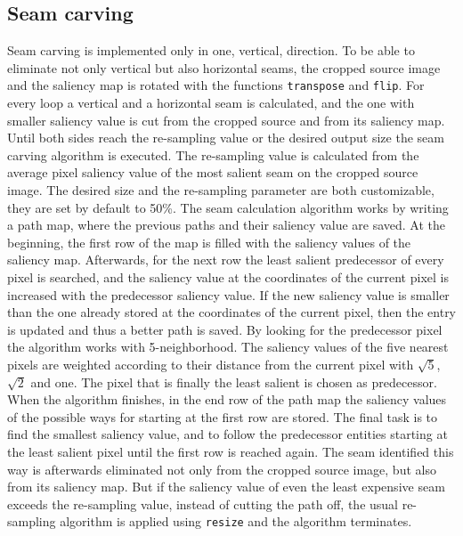 \documentclass[draft,final]{vutinfth} %
\begin{document}
	\subsection{Seam carving}
	Seam carving is implemented only in one, vertical, direction. 
	To be able to eliminate not only vertical but also horizontal seams, the cropped source image and the saliency map is rotated with the functions \texttt{transpose} and \texttt{flip}.
	For every loop a vertical and a horizontal seam is calculated, and the one with smaller saliency value is cut from the cropped source and from its saliency map.
	Until both sides reach the re-sampling value or the desired output size the seam carving algorithm is executed.
	The re-sampling value is calculated from the average pixel saliency value of the most salient seam on the cropped source image.
	The desired size and the re-sampling parameter are both customizable, they are set by default to 50\%. 
	The seam calculation algorithm works by writing a path map, where the previous paths and their saliency value are saved.
	At the beginning, the first row of the map is filled with the saliency values of the saliency map.
	Afterwards, for the next row the least salient predecessor of every pixel is searched, and the saliency value at the coordinates of the current pixel is increased with the predecessor saliency value.
	If the new saliency value is smaller than the one already stored at the coordinates of the current pixel, then the entry is updated and thus a better path is saved.
	By looking for the predecessor pixel the algorithm works with 5-neighborhood. 
	The saliency values of the five nearest pixels are weighted according to their distance from the current pixel with $\sqrt{5}$, $\sqrt{2}$ and one.
	The pixel that is finally the least salient is chosen as predecessor.
	When the algorithm finishes, in the end row of the path map the saliency values of the possible ways for starting at the first row are stored.
	The final task is to find the smallest saliency value, and to follow the predecessor entities starting at the least salient pixel until the first row is reached again.
	The seam identified this way is afterwards eliminated not only from the cropped source image, but also from its saliency map.
	But if the saliency value of even the least expensive seam exceeds the re-sampling value, instead of cutting the path off, the usual re-sampling algorithm is applied using \texttt{resize} and the algorithm terminates.  
	
\end{document}
